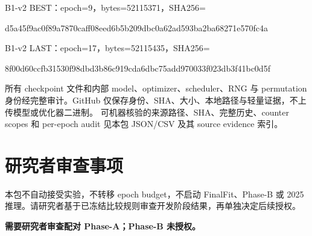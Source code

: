 \documentclass[UTF8,a4paper,11pt,fontset=windows]{ctexart}
\begin{document}
B1-v2 BEST：epoch=9，bytes=52115371，SHA256=\par
{\footnotesize\ttfamily d5a45f9ac0f89a7870caff08eed6b5b209dbc0a62ad593ba2ba68271e570fc4a}\par
{\footnotesize{}}\par
B1-v2 LAST：epoch=17，bytes=52115435，SHA256=\par
{\footnotesize\ttfamily 8f00d60ccfb31530f98dbd3b86c919cda6dbc75add970033f023db3f41bc0d5f}\par
{\footnotesize{}}\par
所有 checkpoint 文件和内部 model、optimizer、scheduler、RNG 与 permutation 身份经完整审计。GitHub 仅保存身份、SHA、大小、本地路径与轻量证据，不上传模型或优化器二进制。
可机器核验的来源路径、SHA、完整历史、counter scopes 和 per-epoch audit 见本包 JSON/CSV 及其 source evidence 索引。
\section{研究者审查事项}
本包不自动接受实验，不转移 epoch budget，不启动 FinalFit、Phase-B 或 2025 推理。请研究者基于已冻结比较规则审查开发阶段结果，再单独决定后续授权。
\par\textbf{需要研究者审查配对 Phase-A；Phase-B 未授权。}\par
\end{document}

